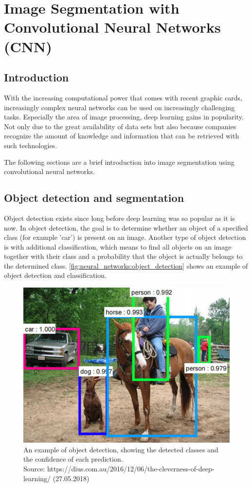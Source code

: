 
\chapter{Image Segmentation with Convolutional Neural Networks (CNN)}\label{chp:segmentation_with_neural_networks}
\section{Introduction}
With the increasing computational power that comes with recent graphic cards, increasingly complex neural networks can be used on increasingly challenging tasks. Especially the area of image processing, deep learning gains in popularity. Not only due to the great availability of data sets but also because companies recognize the amount of knowledge and information that can be retrieved with such technologies.

The following sections are a brief introduction into image segmentation using convolutional neural networks.

\section{Object detection and segmentation}
Object detection exists since long before deep learning was so popular as it is now. In object detection, the goal is to determine whether an object of a specified class (for example 'car') is present on an image. Another type of object detection is with additional classification, which means to find all objects on an image together with their class and a probability that the object is actually belongs to the determined class. \autoref{fig:neural_networks:object_detection} shows an example of object detection and classification.

\begin{figure}[H]
    \centering
	\includegraphics[width=0.6\linewidth]{chapters/neural_networks/images/object_detection.png}
	\caption{An example of object detection, showing the detected classes and the confidence of each prediction.\\ Source: https://dius.com.au/2016/12/06/the-cleverness-of-deep-learning/ (27.05.2018)}
	\label{fig:neural_networks:object_detection}
\end{figure}

